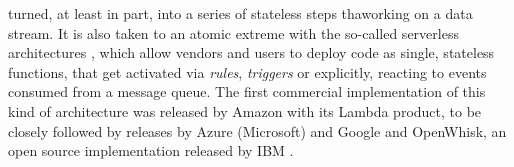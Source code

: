 \documentclass{llncs}
\begin{document}
  turned, at least in part, into a series of stateless steps thaworking on a data stream.
    It is also taken to an atomic extreme
    with the so-called serverless architectures \cite{Varghese2018849},
    which allow vendors and users to deploy code as single, stateless
    functions, that get activated via {\em rules}, {\em triggers} or
    explicitly, reacting to events consumed from
    a message queue.
    The first commercial
    implementation of this kind of architecture was released by Amazon
    with its Lambda product, to be closely followed by releases by Azure
    (Microsoft) and Google and OpenWhisk, an open source implementation
    released by IBM \cite{Baldini2016287}.



\end{document}
